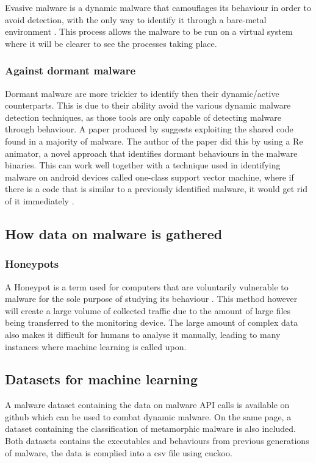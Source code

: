\documentclass[progress]{cmpreport}
\begin{document}
			Evasive malware is a dynamic malware that camouflages its behaviour in order to avoid detection, with the only way to identify it through a bare-metal environment \citep{10.1145/2810103.2813642}. This process allows the malware to be run on a virtual system where it will be clearer to see the processes taking place. 
			
			\subsubsection{Against dormant malware}
			Dormant malware are more trickier to identify then their dynamic/active counterparts. This is due to their ability avoid the various dynamic malware detection techniques, as those tools are only capable of detecting malware through behaviour. A paper produced by \cite{5504706} suggests exploiting the shared code found in a majority of malware. The author of the paper did this by using a Re animator, a novel approach that identifies dormant behaviours in the malware binaries. This can work well together with a technique used in identifying malware on android devices called one-class support vector machine, where if there is a code that is similar to a previously identified malware, it would get rid of it immediately \citep{6298824}.
			
		\subsection{How data on malware is gathered}
			\subsubsection{Honeypots}
			A Honeypot is a term used for computers that are voluntarily vulnerable to malware for the sole purpose of studying its behaviour \citep{10.1007/978-3-642-33018-6_28}. This method however will create a large volume of collected traffic due to the amount of large files being transferred to the monitoring device. The large amount of complex data also makes it difficult for humans to analyse it manually, leading to many instances where machine learning is called upon.
			
		\subsection{Datasets for machine learning}
			A malware dataset containing the data on malware API calls is available on github which can be used to combat dynamic malware. On the same page, a dataset containing the classification of metamorphic malware is also included. Both datasets contains the executables and behaviours from previous generations of malware, the data is complied into a csv file using cuckoo\citep{10.7717/peerj-cs.346}.
			
\end{document}

